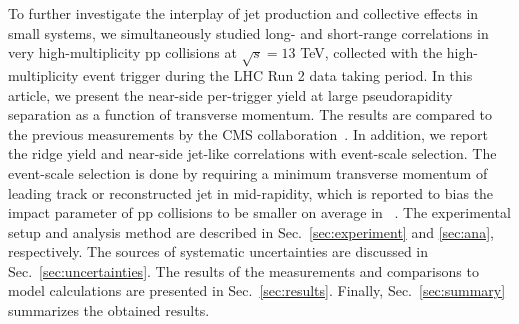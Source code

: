 % 

To further investigate the interplay of jet production and collective effects in small systems, we simultaneously studied long- and short-range correlations in very high-multiplicity pp collisions at $\sqrt{s} =13$ TeV, collected with the high-multiplicity event trigger during the LHC Run 2 data taking period. In this article, we present the near-side per-trigger yield at large pseudorapidity separation as a function of transverse momentum. The results are compared to the previous measurements by the CMS collaboration~\cite{Khachatryan:2015lva}. %
In addition, we report the ridge yield and near-side jet-like correlations with event-scale selection. The event-scale selection is done by requiring a minimum transverse momentum of leading track or reconstructed jet in mid-rapidity, which is reported to bias the impact parameter of pp collisions to be smaller on average in ~\cite{Sjostrand:1986ep,Frankfurt:2010ea}.
The experimental setup and analysis method are described in Sec.~\ref{sec:experiment} and \ref{sec:ana}, respectively. The sources of systematic uncertainties are discussed in Sec.~\ref{sec:uncertainties}. The results of the measurements and comparisons to model calculations are presented in Sec.~\ref{sec:results}. Finally, Sec.~\ref{sec:summary} summarizes the obtained results.


